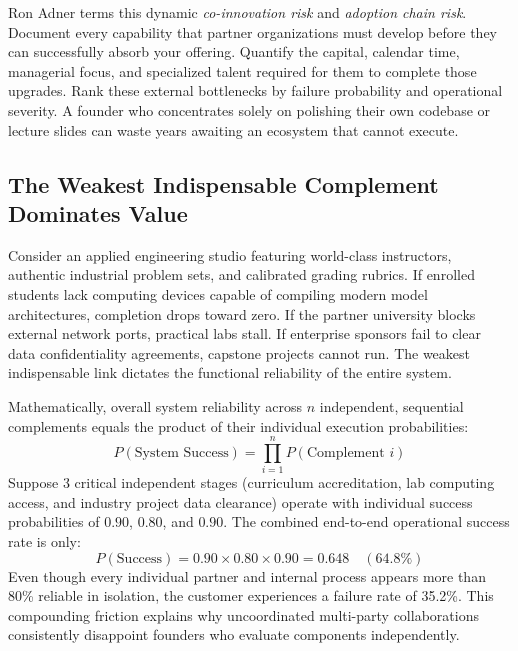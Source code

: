 Ron Adner terms this dynamic \textit{co-innovation risk} and \textit{adoption chain risk}. Document every capability that partner organizations must develop before they can successfully absorb your offering. Quantify the capital, calendar time, managerial focus, and specialized talent required for them to complete those upgrades. Rank these external bottlenecks by failure probability and operational severity. A founder who concentrates solely on polishing their own codebase or lecture slides can waste years awaiting an ecosystem that cannot execute.

\subsection{The Weakest Indispensable Complement Dominates Value}
\label{sec:weakest_indispensable_complement}

Consider an applied engineering studio featuring world-class instructors, authentic industrial problem sets, and calibrated grading rubrics. If enrolled students lack computing devices capable of compiling modern model architectures, completion drops toward zero. If the partner university blocks external network ports, practical labs stall. If enterprise sponsors fail to clear data confidentiality agreements, capstone projects cannot run. The weakest indispensable link dictates the functional reliability of the entire system.

Mathematically, overall system reliability across $n$ independent, sequential complements equals the product of their individual execution probabilities:
\begin{equation}
\label{eq:conditional_ecosystem_reliability}
P(\text{System Success}) = \prod_{i=1}^{n} P(\text{Complement } i)
\end{equation}
Suppose 3 critical independent stages (curriculum accreditation, lab computing access, and industry project data clearance) operate with individual success probabilities of $0.90$, $0.80$, and $0.90$. The combined end-to-end operational success rate is only:
\begin{equation}
\label{eq:combined_probability_example}
P(\text{Success}) = 0.90 \times 0.80 \times 0.90 = 0.648 \quad (64.8\%)
\end{equation}
Even though every individual partner and internal process appears more than 80\% reliable in isolation, the customer experiences a failure rate of 35.2\%. This compounding friction explains why uncoordinated multi-party collaborations consistently disappoint founders who evaluate components independently.

